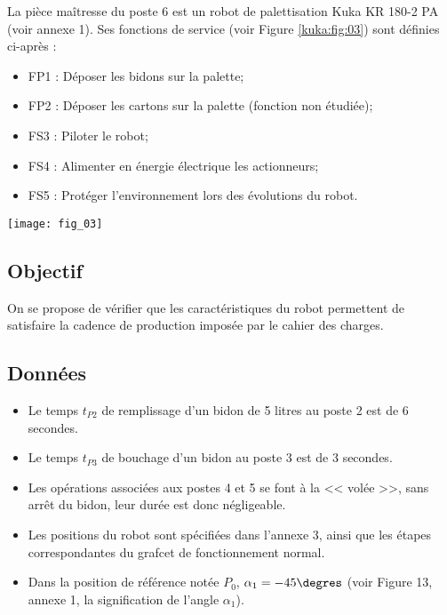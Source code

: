 \vspace{.4cm}
\noindent\begin{minipage}[c]{.53\linewidth}
La pièce maîtresse du poste 6 est un robot de palettisation Kuka KR 180-2 PA (voir annexe 1). Ses fonctions de service (voir Figure \ref{kuka:fig:03}) sont définies ci-après : 
\begin{itemize}
\item FP1 : Déposer les bidons sur la palette;
\item FP2 : Déposer les cartons sur la palette (fonction non étudiée);
\item FS3 : Piloter le robot;
\item FS4 : Alimenter en énergie électrique les actionneurs;
\item FS5 : Protéger l’environnement lors des évolutions du robot.
\end{itemize}

\end{minipage} \hfill
\begin{minipage}[c]{.45\linewidth}
\begin{center}
\texttt{[image: fig\_03]}
\end{center}
\end{minipage}

\vspace{.4cm}




\subsection{Objectif }
On se propose de vérifier que les caractéristiques du robot permettent de satisfaire la cadence 
de production imposée par le cahier des charges. 

\subsection{Données \label{sec:2-2}}
\begin{itemize}
\item Le temps $t_{P2}$ de remplissage d’un bidon de 5 litres au poste 2 est de 6 secondes. 
\item Le temps $t_{P3}$ de bouchage d’un bidon au poste 3 est de 3 secondes. 
\item Les opérations associées aux postes 4 et 5 se font à la << volée >>, sans arrêt du bidon,
leur durée est donc négligeable. 
\item Les positions du robot sont spécifiées dans l’annexe 3, 
ainsi que les étapes correspondantes du grafcet de fonctionnement normal. 
\item Dans la position de référence notée $P_0$, $\alpha_1 = -45\degres$ (voir Figure 13, annexe 1, la signification de l’angle $\alpha_1$). 
\end{itemize}

